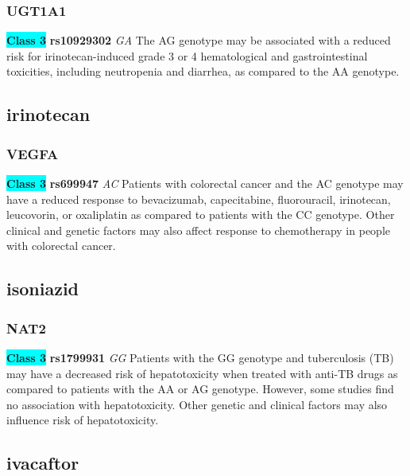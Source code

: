 \documentclass{book}
\begin{document}
\subsubsection{ UGT1A1 }

\begin{center}
\textbf{\colorbox{cyan} {Class 3}} \textbf{ rs10929302 } \textit{ GA }
The AG genotype may be associated with a reduced risk for irinotecan-induced grade 3 or 4 hematological and gastrointestinal toxicities, including neutropenia and diarrhea, as compared to the AA genotype. 


\end{center}\subsection{ irinotecan }


\subsubsection{ VEGFA }

\begin{center}
\textbf{\colorbox{cyan} {Class 3}} \textbf{ rs699947 } \textit{ AC }
Patients with colorectal cancer and the AC genotype may have a reduced response to bevacizumab, capecitabine, fluorouracil, irinotecan, leucovorin, or oxaliplatin as compared to patients with the CC genotype. Other clinical and genetic factors may also affect response to chemotherapy in people with colorectal cancer.


\end{center}\subsection{ isoniazid }


\subsubsection{ NAT2 }

\begin{center}
\textbf{\colorbox{cyan} {Class 3}} \textbf{ rs1799931 } \textit{ GG }
Patients with the GG genotype and tuberculosis (TB) may have a decreased risk of hepatotoxicity when treated with anti-TB drugs as compared to patients with the AA or AG genotype. However, some studies find no association with hepatotoxicity. Other genetic and clinical factors may also influence risk of hepatotoxicity.


\end{center}\subsection{ ivacaftor }
\end{document}
